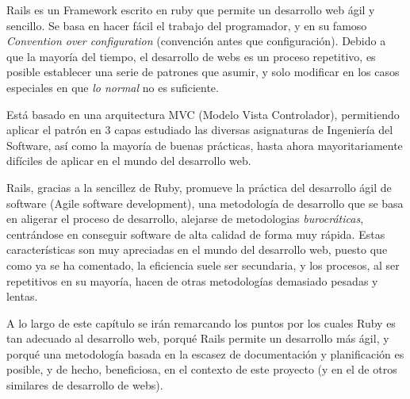 Rails es un Framework escrito en ruby que permite un desarrollo web ágil y sencillo. Se basa en hacer fácil el trabajo del programador, y en su famoso \emph{Convention over configuration} (convención antes que configuración). Debido a que la mayoría del tiempo, el desarrollo de webs es un proceso repetitivo, es posible establecer una serie de patrones que asumir, y solo modificar en los casos especiales en que \emph{lo normal} no es suficiente.

Está basado en una arquitectura MVC (Modelo Vista Controlador), permitiendo aplicar el patrón en 3 capas estudiado las diversas asignaturas de Ingeniería del Software, así como la mayoría de buenas prácticas, hasta ahora mayoritariamente difíciles de aplicar en el mundo del desarrollo web.

Rails, gracias a la sencillez de Ruby, promueve la práctica del desarrollo ágil de software (Agile software development), una metodología de desarrollo que se basa en aligerar el proceso de desarrollo, alejarse de metodologias \emph{burocráticas}, centrándose en conseguir software de alta calidad de forma muy rápida. Estas características son muy apreciadas en el mundo del desarrollo web, puesto que como ya se ha comentado, la eficiencia suele ser secundaria, y los procesos, al ser repetitivos en su mayoría, hacen de otras metodologías demasiado pesadas y lentas.

A lo largo de este capítulo se irán remarcando los puntos por los cuales Ruby es tan adecuado al desarrollo web, porqué Rails permite un desarrollo más ágil, y porqué una metodología basada en la escasez de documentación y planificación es posible, y de hecho, beneficiosa, en el contexto de este proyecto (y en el de otros similares de desarrollo de webs). 

